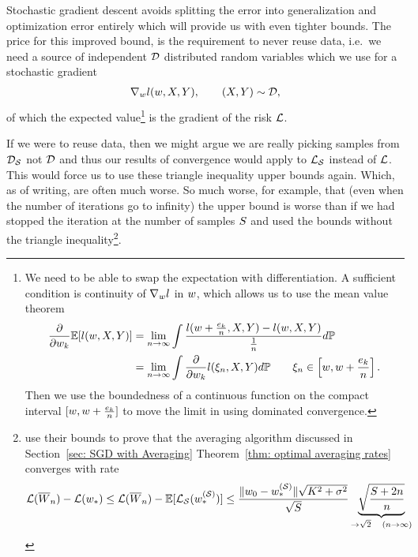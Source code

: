 Stochastic gradient descent avoids splitting the error into generalization and
optimization error entirely which will provide us with even tighter bounds. The
price for this improved bound, is the requirement to never reuse data, i.e.\ we
need a source of independent \(\mathcal{D}\) distributed random variables which we use
for a stochastic gradient
%
\begin{align*}
	\nabla_wl (w, X,Y), \qquad (X,Y)\sim\mathcal{D},
\end{align*}
%
of which the expected value\footnote{
	We need to be able to swap the expectation with differentiation. A sufficient 
	condition is continuity of \(\nabla_wl\) in \(w\), which allows us
	to use the mean value theorem
	\begin{align*}
		\frac{\partial}{\partial w_k}\mathbb{E}[l(w, X,Y)]
		&= \lim_{n\to\infty}
		\int\frac{l(w+\frac{e_k}{n}, X,Y)-l(w,X,Y)}{\frac{ 1 }{ n }}d\mathbb{P}
		\\
		&=\lim_{n\to\infty} \int\frac{\partial}{\partial w_k}l(\xi_n, X,Y)d\mathbb{P}
		\qquad \xi_n \in \left[w, w + \frac{ e_k }{ n }\right].
	\end{align*}
	Then we use the boundedness of a continuous function on the compact interval
	\([w, w + \frac{ e_k }{ n }]\) to move the limit in using
	dominated convergence.
} is the gradient of the risk \(\mathcal{L}\).

If we were to reuse data, then we might argue we are really picking samples
from \(\mathcal{D}_{\mathcal{S}}\) not \(\mathcal{D}\) and thus our results of convergence would
apply to \(\mathcal{L}_{\mathcal{S}}\) instead of \(\mathcal{L}\). This would force us to use
these triangle inequality upper bounds again. Which, as of writing, are often
much worse. So much worse, for example, that (even when the number of iterations go to
infinity) the upper bound is worse than if we had stopped the iteration at the
number of samples \(S\) and used the bounds without the triangle
inequality\footnote{
	\textcite{hardtTrainFasterGeneralize2016} use their bounds to prove that
	the averaging algorithm discussed in Section~\ref{sec: SGD with Averaging}
	Theorem~\ref{thm: optimal averaging rates} converges with rate
	\begin{align*}
		\mathcal{L}(\overline{W}_n) - \mathcal{L}(w_*)
		\le \mathcal{L}(\overline{W}_n) - \mathbb{E}[\mathcal{L}_{\mathcal{S}}(w_*^{(\mathcal{S})})]
		\le \frac{\|w_0 -w_*^{(\mathcal{S})}\|\sqrt{K^2 + \sigma^2}}{\sqrt{S}}
		\underbrace{\sqrt{\frac{S+2n}{n}}}_{\to \sqrt{2} \quad (n\to\infty)}
	\end{align*}
}.

